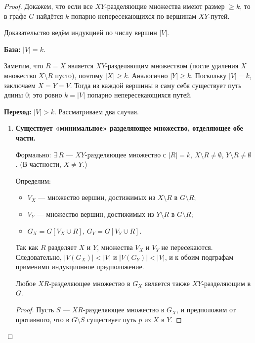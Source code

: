 \begin{proof}
	Докажем, что если все $XY$-разделяющие множества имеют размер
	$\geq k$, то в графе $G$ найдётся $k$ попарно непересекающихся
	по вершинам $XY$-путей.
	
	Доказательство ведём индукцией по числу вершин $|V|$.
	
	\medskip
	\noindent\textbf{База:} $|V| = k$.
	
	Заметим, что $R = X$ является $XY$-разделяющим множеством
	(после удаления $X$ множество $X \setminus R$ пусто),
	поэтому $|X| \geq k$. Аналогично $|Y| \geq k$.
	Поскольку $|V| = k$, заключаем $X = Y = V$.
	Тогда из каждой вершины в саму себя существует путь длины $0$;
	это ровно $k = |V|$ попарно непересекающихся путей. \checkmark
	
	\medskip
	\noindent\textbf{Переход:} $|V| > k$. Рассматриваем два случая.
	
	\begin{enumerate}
		\item \textbf{Существует «минимальное» разделяющее множество,
			отделяющее обе части.}
		
		Формально: $\exists\, R$ --- $XY$-разделяющее множество с
		$|R| = k$, $X \setminus R \neq \emptyset$,
		$Y \setminus R \neq \emptyset$.
		(В частности, $X \neq Y$.)
		
		\medskip
		Определим:
		\begin{itemize}
			\item $V_X$ --- множество вершин, достижимых из $X \setminus R$
			в $G \setminus R$;
			\item $V_Y$ --- множество вершин, достижимых из $Y \setminus R$
			в $G \setminus R$;
			\item $G_X = G[V_X \cup R]$, \quad $G_Y = G[V_Y \cup R]$.
		\end{itemize}
		
		Так как $R$ разделяет $X$ и $Y$, множества $V_X$ и $V_Y$
		не пересекаются. Следовательно, $|V(G_X)| < |V|$ и
		$|V(G_Y)| < |V|$, и к обоим подграфам применимо
		индукционное предположение.
		
		\begin{Statement}{}{}
			Любое $XR$-разделяющее множество в $G_X$ является
			также $XY$-разделяющим в $G$.
		\end{Statement}
		\begin{proof}
			Пусть $S$ --- $XR$-разделяющее множество в $G_X$, и
			предположим от противного, что в $G \setminus S$
			существует путь $p$ из $X$ в $Y$.
			

\end{proof}
\end{enumerate}
\end{proof}
